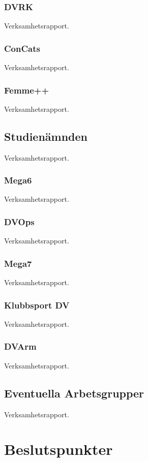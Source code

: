 \documentclass[protokoll]{dvd}
\begin{document}
\subsubsection*{DVRK}
Verksamhetsrapport.


\subsubsection*{ConCats}
Verksamhetsrapport.


\subsubsection*{Femme++}
Verksamhetsrapport.

\subsection{Studienämnden}
Verksamhetsrapport.

\subsubsection*{Mega6}
Verksamhetsrapport.

\subsubsection*{DVOps}
Verksamhetsrapport.

\subsubsection*{Mega7}
Verksamhetsrapport.

\subsubsection*{Klubbsport DV}
Verksamhetsrapport.

\subsubsection*{DVArm}
Verksamhetsrapport.

\subsection{Eventuella Arbetsgrupper}
Verksamhetsrapport.


\newpage

\section{Beslutspunkter}
\end{document}
